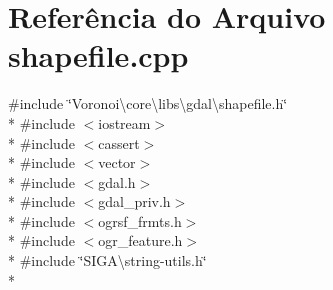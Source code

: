 \section{Referência do Arquivo shapefile.\+cpp}
\label{shapefile_8cpp}
{\ttfamily \#include \char`\"{}Voronoi\textbackslash{}core\textbackslash{}libs\textbackslash{}gdal\textbackslash{}shapefile.\+h\char`\"{}}\\*
{\ttfamily \#include $<$iostream$>$}\\*
{\ttfamily \#include $<$cassert$>$}\\*
{\ttfamily \#include $<$vector$>$}\\*
{\ttfamily \#include $<$gdal.\+h$>$}\\*
{\ttfamily \#include $<$gdal\+\_\+priv.\+h$>$}\\*
{\ttfamily \#include $<$ogrsf\+\_\+frmts.\+h$>$}\\*
{\ttfamily \#include $<$ogr\+\_\+feature.\+h$>$}\\*
{\ttfamily \#include \char`\"{}S\+I\+G\+A\textbackslash{}string-\/utils.\+h\char`\"{}}\\*
